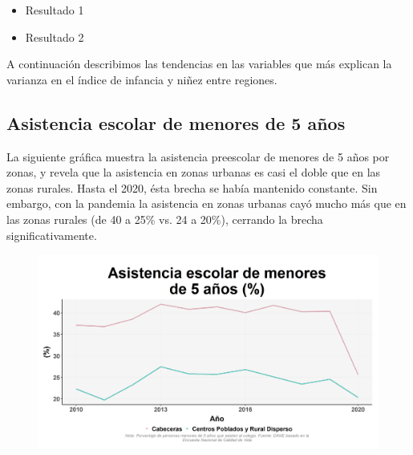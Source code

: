     
    \begin{tcolorbox}[enhanced, colback=mycolor,colframe=mycolor,drop fuzzy shadow,watermark color=white,
                        title=Principales Resultados]
    
            \begin{itemize}
                    \item Resultado 1 
                    \item Resultado 2
            \end{itemize}
     
    \end{tcolorbox}
        
        A continuación describimos las tendencias en las variables que más explican la varianza en el índice de infancia y niñez entre regiones.  
        
    \subsection{Asistencia escolar de menores de 5 años}

        La siguiente gráfica  muestra la asistencia preescolar de menores de 5 años por zonas, y revela que la asistencia en zonas urbanas es casi el doble que en las zonas rurales. Hasta el 2020, ésta brecha se había mantenido constante. Sin embargo, con la pandemia la asistencia en  zonas urbanas cayó mucho más que en las zonas rurales (de 40 a 25\% vs. 24 a 20\%), cerrando la brecha significativamente.

    \begin{figure}[H]
        \caption[Asistencia escolar de menores de 5 años por zonas]{\label{asist5_zona_scatter} }
        \begin{center}
        \includegraphics[width=\textwidth,keepaspectratio]{img/var_100_trend.png}
        \end{center}
    \end{figure}
 

